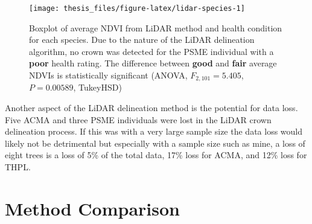 \documentclass[12pt,twoside]{reedthesis}
\begin{document}
\begin{figure}

{\centering \texttt{[image: thesis\_files/figure-latex/lidar-species-1]} 

}

\caption[NDVI and health condition for LiDAR method]{Boxplot of average NDVI from LiDAR method and health condition for each species. Due to the nature of the LiDAR delineation algorithm, no crown was detected for the PSME individual with a \textbf{poor} health rating. The difference between \textbf{good} and \textbf{fair} average NDVIs is statistically significant (ANOVA, \(F_{2,101} = 5.405\), \(P = 0.00589\), TukeyHSD)}\label{fig:lidar-species}
\end{figure}
Another aspect of the LiDAR delineation method is the potential for data loss. Five ACMA and three PSME individuals were lost in the LiDAR crown delineation process. If this was with a very large sample size the data loss would likely not be detrimental but especially with a sample size such as mine, a loss of eight trees is a loss of 5\% of the total data, 17\% loss for ACMA, and 12\% loss for THPL.

\hypertarget{method-comparison}{%
\section{Method Comparison}\label{method-comparison}}
\end{document}
